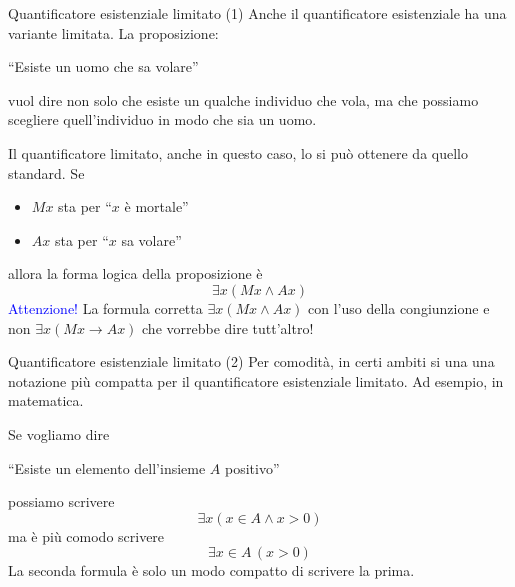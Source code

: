 \documentclass[aspectratio=169,10pt,dvipsnames,xcolor=table,handout]{beamer}
\begin{document}
\begin{frame}{Quantificatore esistenziale limitato (1)}
    Anche il quantificatore esistenziale ha una variante limitata. La proposizione:
    \begin{center}
        ``Esiste un uomo che sa volare''
    \end{center}
    vuol dire non solo che esiste un qualche individuo che vola, ma che possiamo scegliere quell'individuo in modo che sia un uomo.

    \medskip
    Il quantificatore limitato, anche in questo caso, lo si può ottenere da quello standard. Se
    \begin{itemize}
        \item $Mx$ sta per ``$x$ è mortale''
        \item $Ax$ sta per ``$x$ sa volare''
    \end{itemize}
    allora la forma logica della proposizione è
    \[
        \exists x (Mx \wedge Ax)
    \]
    \textcolor{Blue}{Attenzione!} La formula corretta $\exists x (Mx \land Ax)$ con l'uso della \alert{congiunzione} e non  $\exists x (Mx \to Ax)$ che vorrebbe dire tutt'altro!
\end{frame}

\begin{frame}{Quantificatore esistenziale limitato (2)}
    Per comodità, in certi ambiti si una una notazione più compatta per il quantificatore esistenziale limitato. Ad esempio, in matematica.
    \begin{example}
        Se vogliamo dire
        \begin{center}
            ``Esiste un elemento dell'insieme $A$ positivo''
        \end{center}
        possiamo scrivere
        \[
            \exists x (x \in A \wedge x > 0)
        \]
        ma è più comodo scrivere
        \[
            \exists x \in A \, (x > 0)
        \]
        La seconda formula è solo un modo compatto di scrivere la prima.
    \end{example}
\end{frame}
\end{document}
